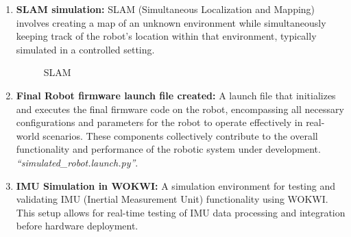 {\begin{enumerate}[label=\textbf{\arabic*}., leftmargin=*]
		\vspace{2in}
        
		\item \textbf{SLAM simulation:} SLAM (Simultaneous Localization and Mapping) involves creating a
		map of an unknown environment while simultaneously keeping track of the robot's location
		within that environment, typically simulated in a controlled setting.
		
		\begin{figure}[H]
			\centering
			\hfill
			\hfill
			\caption{SLAM}
			\label{fig:slamsim}
		\end{figure}
		
		\item \textbf{Final Robot firmware launch file created:} A launch file that initializes and executes the
		final firmware code on the robot, encompassing all necessary configurations and
		parameters for the robot to operate effectively in real-world scenarios. These components
		collectively contribute to the overall functionality and performance of the robotic system
		under development. \emph{“simulated\_robot.launch.py”}.
		
		\item \textbf{IMU Simulation in WOKWI:} A simulation environment for testing and validating IMU (Inertial Measurement Unit) functionality using WOKWI. This setup allows for real-time testing of IMU data processing and integration before hardware deployment.
		

\end{enumerate}}
